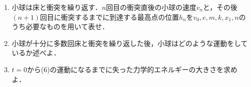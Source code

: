 \begin{enumerate}[label=\textbf{問\arabic*}]
\begin{enumerate}[(1), resume]
    {\hzw}時刻$t = t_1$に，小球が床と初めて衝突する直前の小球の速さ$v_0$は$v_0 = \text{\boxkm{ア}{m, k, h, x_1}}$である．

    {\hzw}床と衝突した後，小球は位置$h_1 = \text{\boxkm{イ}{v_0, e, m, k, x_1}}$まで到達し，再び落下して床と衝突する．問2で考えた，小球と床が弾性衝突する場合の衝突の時間間隔$\varDelta t$と比較すると，小球が初めて床と衝突してから次に床と衝突するまでの時間間隔は｛ウ{\hzw}①長くなる{\hzw}②変化しない{\hzw}③短くなる｝．

    \item{\hzw}小球は床と衝突を繰り返す．$n$回目の衝突直後の小球の速度$v_n$と，その後$(n+1)$回目に衝突するまでに到達する最高点の位置$h_n$を$v_0, e, m, k, x_1, n$のうち必要なものを用いて表せ．
    \item {\hzw}小球が十分に多数回床と衝突を繰り返した後，小球はどのような運動をしているか述べよ．
    \item {\hzw}$t = 0$から(6)の運動になるまでに失った力学的エネルギーの大きさを求めよ．
  \end{enumerate}
\end{enumerate}
